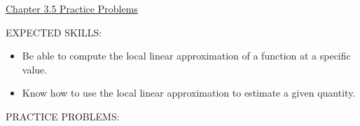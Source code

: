 \documentclass[12pt]{article}
\begin{document}
\begin{center}
\underline{\LARGE{Chapter 3.5 Practice Problems}}
\end{center}

\noindent EXPECTED SKILLS:

\begin{itemize}

\item Be able to compute the local linear approximation of a function at a specific value. 

\item Know how to use the local linear approximation to estimate a given quantity.

\end{itemize}

\noindent PRACTICE PROBLEMS:

\medskip

\end{document}
